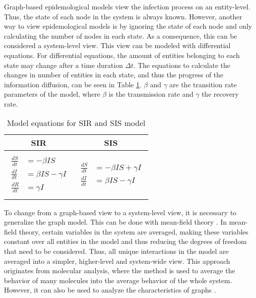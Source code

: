 Graph-based epidemological models view the infection process on an entity-level.
Thus, the state of each node in the system is always known.
However, another way to view epidemological models is by ignoring the 
state of each node and only calculating the number of nodes in each state.
As a consequence, this can be considered a system-level view.
This view can be modeled with differential equations.
For differential equations, the amount of entities belonging to each state may change 
after a time duration $\Delta t$. The equations to calculate the 
changes in number of entities in each state, and thus the progress 
of the information diffusion, can be seen in Table \ref{SI-table-equations}.
$\beta$ and $\gamma$ are the transition rate parameters of the model,
where $\beta$ is the transmission rate and $\gamma$ the 
recovery rate.

\begin{table}[ht!]
    \centering
    \begin{tabular}{|c | c |} 
     \hline
     SIR & SIS  \\ 
     \hline
     & \\
     $\begin{aligned}
          \frac{dS}{dt} &= -\beta I S \\
          \frac{dI}{dt} &= \beta I S - \gamma I \\
          \frac{dR}{dt} &= \gamma I  
        \end{aligned}$
      &
      $\begin{aligned}
          \frac{dS}{dt} &= -\beta I S + \gamma I\\
          \frac{dI}{dt} &= \beta I S - \gamma I
        \end{aligned}$
       \\ 
       & \\
     \hline
    \end{tabular}
    \caption{Model equations for SIR and SIS model \cite{sirequation}}
    \label{SI-table-equations}
\end{table}

To change from a graph-based view to a system-level view, it is necessary
to generalize the graph model. This can be done with
mean-field theory \cite{chaikin1995principles}.
In mean-field theory, certain variables in the system are averaged, 
making these variables constant over all entities in the model and thus 
reducing the degrees of freedom that need to be considered.
Thus, all unique interactions in the model are averaged into a simpler,
higher-level and system-wide view.
This approach originates from molecular analysis, where the method is used
to average the behavior of many molecules into the average behavior
of the whole system.
However, it can also be used to analyze the characteristics of graphs
\cite{barabasi1999mean}\cite{sirsmodel}.

